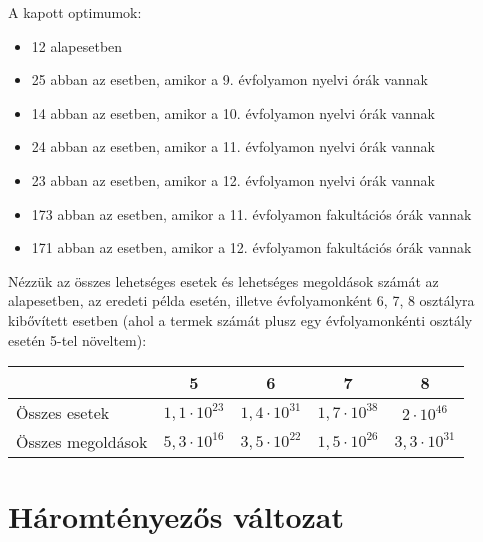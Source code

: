 \documentclass[a4paper,12pt]{article}
\begin{document}
A kapott optimumok:
\begin{itemize}
    \item 12 alapesetben
    \item 25 abban az esetben, amikor a 9. évfolyamon nyelvi órák vannak
    \item 14 abban az esetben, amikor a 10. évfolyamon nyelvi órák vannak
    \item 24 abban az esetben, amikor a 11. évfolyamon nyelvi órák vannak
    \item 23 abban az esetben, amikor a 12. évfolyamon nyelvi órák vannak
    \item 173 abban az esetben, amikor a 11. évfolyamon fakultációs órák vannak
    \item 171 abban az esetben, amikor a 12. évfolyamon fakultációs órák vannak
\end{itemize}

Nézzük az összes lehetséges esetek és lehetséges megoldások számát az alapesetben, az eredeti példa esetén,
illetve évfolyamonként 6, 7, 8 osztályra kibővített esetben (ahol a termek számát plusz egy évfolyamonkénti osztály
esetén 5-tel növeltem): 

\begin{tabular}{l|c|c|c|c|}
& 5 & 6 & 7 & 8 \\
\hline
Összes esetek & $1,1 \cdot 10^{23}$ & $1,4 \cdot 10^{31}$ & $1,7 \cdot 10^{38}$ & $2 \cdot 10^{46}$ \\ 
Összes megoldások & $5,3 \cdot 10^{16}$ & $3,5 \cdot 10^{22}$ & $1,5 \cdot 10^{26}$ & $3,3 \cdot 10^{31}$ \\
\hline
\end{tabular}

\section{Háromtényezős változat}
\end{document}

